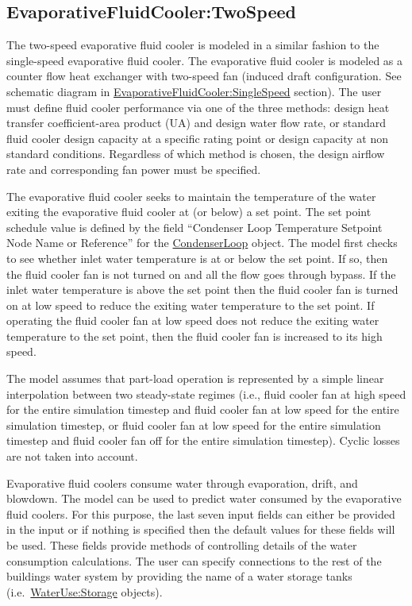 \subsection{EvaporativeFluidCooler:TwoSpeed}\label{evaporativefluidcoolertwospeed}

The two-speed evaporative fluid cooler is modeled in a similar fashion to the single-speed evaporative fluid cooler. The evaporative fluid cooler is modeled as a counter flow heat exchanger with two-speed fan (induced draft configuration. See schematic diagram in \hyperref[evaporativefluidcoolersinglespeed]{Evaporative\hyperref[fluidcoolersinglespeed]{FluidCooler:SingleSpeed}} section). The user must define fluid cooler performance via one of the three methods: design heat transfer coefficient-area product (UA) and design water flow rate, or standard fluid cooler design capacity at a specific rating point or design capacity at non standard conditions. Regardless of which method is chosen, the design airflow rate and corresponding fan power must be specified.

The evaporative fluid cooler seeks to maintain the temperature of the water exiting the evaporative fluid cooler at (or below) a set point. The set point schedule value is defined by the field ``Condenser Loop Temperature Setpoint Node Name or Reference'' for the \hyperref[condenserloop]{CondenserLoop} object. The model first checks to see whether inlet water temperature is at or below the set point. If so, then the fluid cooler fan is not turned on and all the flow goes through bypass. If the inlet water temperature is above the set point then the fluid cooler fan is turned on at low speed to reduce the exiting water temperature to the set point. If operating the fluid cooler fan at low speed does not reduce the exiting water temperature to the set point, then the fluid cooler fan is increased to its high speed.

The model assumes that part-load operation is represented by a simple linear interpolation between two steady-state regimes (i.e., fluid cooler fan at high speed for the entire simulation timestep and fluid cooler fan at low speed for the entire simulation timestep, or fluid cooler fan at low speed for the entire simulation timestep and fluid cooler fan off for the entire simulation timestep). Cyclic losses are not taken into account.

Evaporative fluid coolers consume water through evaporation, drift, and blowdown. The model can be used to predict water consumed by the evaporative fluid coolers. For this purpose, the last seven input fields can either be provided in the input or if nothing is specified then the default values for these fields will be used. These fields provide methods of controlling details of the water consumption calculations. The user can specify connections to the rest of the buildings water system by providing the name of a water storage tanks (i.e.~\hyperref[waterusestorage]{WaterUse:Storage} objects).

